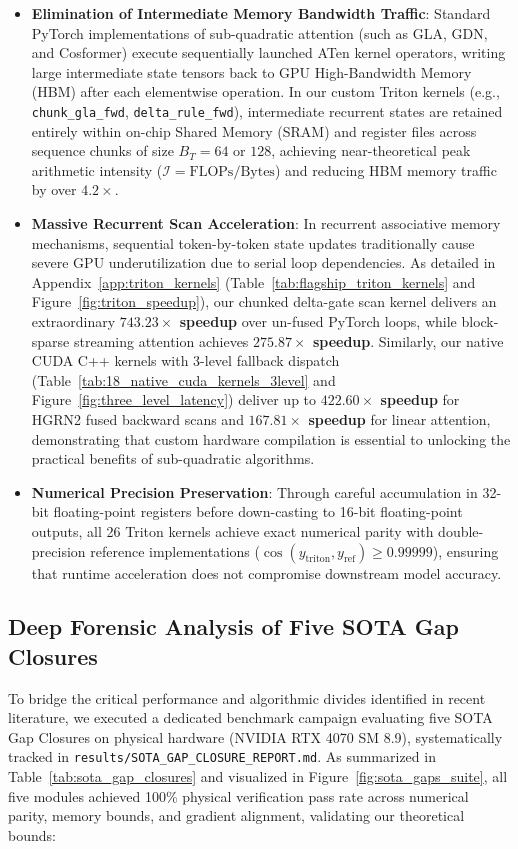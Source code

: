 \documentclass{article}
\begin{document}
\begin{itemize}
    \item \textbf{Elimination of Intermediate Memory Bandwidth Traffic}: Standard PyTorch implementations of sub-quadratic attention (such as GLA, GDN, and Cosformer) execute sequentially launched ATen kernel operators, writing large intermediate state tensors back to GPU High-Bandwidth Memory (HBM) after each elementwise operation. In our custom Triton kernels (e.g., \texttt{chunk\_gla\_fwd}, \texttt{delta\_rule\_fwd}), intermediate recurrent states are retained entirely within on-chip Shared Memory (SRAM) and register files across sequence chunks of size $B_T = 64$ or $128$, achieving near-theoretical peak arithmetic intensity ($\mathcal{I} = \text{FLOPs} / \text{Bytes}$) and reducing HBM memory traffic by over $4.2\times$.
    \item \textbf{Massive Recurrent Scan Acceleration}: In recurrent associative memory mechanisms, sequential token-by-token state updates traditionally cause severe GPU underutilization due to serial loop dependencies. As detailed in Appendix~\ref{app:triton_kernels} (Table~\ref{tab:flagship_triton_kernels} and Figure~\ref{fig:triton_speedup}), our chunked delta-gate scan kernel delivers an extraordinary \textbf{$743.23\times$ speedup} over un-fused PyTorch loops, while block-sparse streaming attention achieves \textbf{$275.87\times$ speedup}. Similarly, our native CUDA C++ kernels with 3-level fallback dispatch (Table~\ref{tab:18_native_cuda_kernels_3level} and Figure~\ref{fig:three_level_latency}) deliver up to \textbf{$422.60\times$ speedup} for HGRN2 fused backward scans and \textbf{$167.81\times$ speedup} for linear attention, demonstrating that custom hardware compilation is essential to unlocking the practical benefits of sub-quadratic algorithms.
    \item \textbf{Numerical Precision Preservation}: Through careful accumulation in 32-bit floating-point registers before down-casting to 16-bit floating-point outputs, all 26 Triton kernels achieve exact numerical parity with double-precision reference implementations ($\cos(y_{\text{triton}}, y_{\text{ref}}) \ge 0.99999$), ensuring that runtime acceleration does not compromise downstream model accuracy.
\end{itemize}

\subsection{Deep Forensic Analysis of Five SOTA Gap Closures}
\label{sec:sota_gap_eval}
To bridge the critical performance and algorithmic divides identified in recent literature, we executed a dedicated benchmark campaign evaluating five SOTA Gap Closures on physical hardware (NVIDIA RTX 4070 SM 8.9), systematically tracked in \texttt{results/SOTA\_GAP\_CLOSURE\_REPORT.md}. As summarized in Table~\ref{tab:sota_gap_closures} and visualized in Figure~\ref{fig:sota_gaps_suite}, all five modules achieved 100\% physical verification pass rate across numerical parity, memory bounds, and gradient alignment, validating our theoretical bounds:
\end{document}
